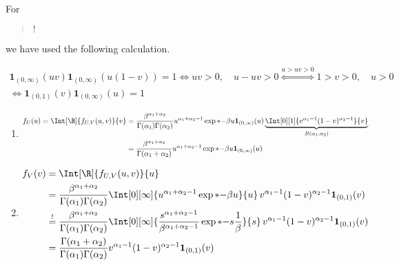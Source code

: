 \begin{solution}
For \blockquote{$!$} we have used the following calculation.

\begin{multline*}
    \mathbf 1_{(0, \infty)}(u v) \mathbf 1_{(0, \infty)}(u (1 - v)) = 1
    \iff
    u v > 0, \quad u - u v > 0
    \stackrel
    {
        u > u v > 0
    }{\iff}
    1 > v > 0, \quad u > 0 \\
    \iff
    \mathbf 1_{(0, 1)}(v) \mathbf 1_{(0, \infty)}(u) = 1
\end{multline*}

\begin{enumerate}[label = (\alph*)]

    \item

    \begin{multline*}
        f_U(u)
        =
        \Int[\R]{f_{U, V}(u, v)}{v}
        =
        \frac{\beta^{\alpha_1 + \alpha_2}}{\Gamma(\alpha_1) \Gamma(\alpha_2)}
        u^{\alpha_1 + \alpha_2 - 1}
        \exp*{-\beta u}
        \mathbf 1_{(0, \infty)}(u)
        \underbrace
        {
            \Int[0][1]
            {
                v^{\alpha_1 - 1}
                (1 - v)^{\alpha_2 - 1}
            }{v}
        }_{
            B(\alpha_1, \alpha_2)
        } \\
        =
        \frac{\beta^{\alpha_1 + \alpha_2}}{\Gamma(\alpha_1 + \alpha_2)}
        u^{\alpha_1 + \alpha_2 - 1}
        \exp*{-\beta u}
        \mathbf 1_{(0, \infty)}(u)
    \end{multline*}

    \item

    \begin{align*}
        f_V(v)
        & =
        \Int[\R]{f_{U, V}(u, v)}{u} \\
        & =
        \frac{\beta^{\alpha_1 + \alpha_2}}{\Gamma(\alpha_1) \Gamma(\alpha_2)}
        \Int[0][\infty]
        {
            u^{\alpha_1 + \alpha_2 - 1}
            \exp*{-\beta u}
        }{u} \,
        v^{\alpha_1 - 1}
        (1 - v)^{\alpha_2 - 1}
        \mathbf 1_{(0, 1)}(v) \\
        & \stackrel{!}{=}
        \frac{\beta^{\alpha_1 + \alpha_2}}{\Gamma(\alpha_1) \Gamma(\alpha_2)}
        \Int[0][\infty]
        {
            \frac{s^{\alpha_1 + \alpha_2 - 1}}{\beta^{\alpha_1 + \alpha_2 - 1}}
            \exp*{-s}
            \frac{1}{\beta}
        }{s} \,
        v^{\alpha_1 - 1}
        (1 - v)^{\alpha_2 - 1}
        \mathbf 1_{(0, 1)}(v) \\
        & =
        \frac{\Gamma(\alpha_1 + \alpha_2)}{\Gamma(\alpha_1) \Gamma(\alpha_2)}
        v^{\alpha_1 - 1}
        (1 - v)^{\alpha_2 - 1}
        \mathbf 1_{(0, 1)}(v)
    \end{align*}


\end{enumerate}
\end{solution}
